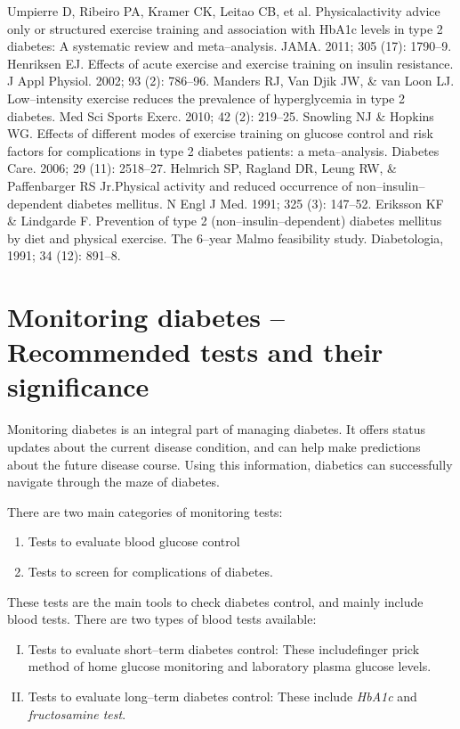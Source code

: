 \begin{thebibliography}{99}
 Umpierre D, Ribeiro PA, Kramer CK, Leitao CB, et al. Physical\break activity advice only or structured exercise training and association with HbA1c levels in type 2 diabetes: A systematic review and meta–analysis. JAMA. 2011; 305 (17): 1790–9.
 Henriksen EJ. Effects of acute exercise and exercise training on insulin resistance. J Appl Physiol. 2002; 93 (2): 786–96.
 Manders RJ, Van Djik JW, \& van Loon LJ. Low–intensity exercise reduces the prevalence of hyperglycemia in type 2 diabetes. Med Sci Sports Exerc. 2010; 42 (2): 219–25.
 Snowling NJ \& Hopkins WG. Effects of different modes of exercise training on glucose control and risk factors for complications in type 2 diabetes patients: a meta–analysis. Diabetes Care. 2006; 29 (11): 2518–27.
 Helmrich SP, Ragland DR, Leung RW, \& Paffenbarger RS Jr.\break Physical activity and reduced occurrence of non–insulin–dependent diabetes mellitus. N Engl J Med. 1991; 325 (3): 147–52.
 Eriksson KF \& Lindgarde F. Prevention of type 2 (non–insulin–dependent) diabetes mellitus by diet and physical exercise. The 6–year Malmo feasibility study. Diabetologia, 1991; 34 (12): 891–8.
\end{thebibliography}


\chapter{Monitoring diabetes – Recommended tests and their significance}\label{chap24}

Monitoring diabetes is an integral part of managing diabetes. It offers status updates about the current disease condition, and can help make predictions about the future disease course. Using this information, diabetics can successfully navigate through the maze of diabetes.

\noindent There are two main categories of monitoring tests:
\begin{enumerate}
\itemsep=0pt
\item Tests to evaluate blood glucose control
\item Tests to screen for complications of diabetes.
\end{enumerate}


These tests are the main tools to check diabetes control, and mainly include blood tests. There are two types of blood tests available:
\begin{enumerate}[I.]
\itemsep=0pt
\item Tests to evaluate short–term diabetes control: These include\break finger prick method of home glucose monitoring and laboratory plasma glucose levels.
\item Tests to evaluate long–term diabetes control: These include \textit{HbA1c} and \textit{fructosamine test}.
\end{enumerate}

